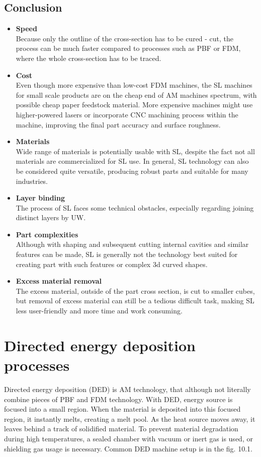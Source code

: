 \documentclass[a4paper, twoside, 11pt]{report}
\newcommand\pro{\item[$+$]}
\newcommand\con{\item[$-$]}
\begin{document}
\section{Conclusion}
\begin{itemize}
\pro \textbf{Speed}\\
Because only the outline of the cross-section has to be cured - cut, the process can be much faster compared to processes such as PBF or FDM, where the whole cross-section has to be traced.

\pro \textbf{Cost}\\
Even though more expensive than low-cost FDM machines, the SL machines for small scale products are on the cheap end of AM machines spectrum, with possible cheap paper feedstock material. More expensive machines might use higher-powered lasers or incorporate CNC machining process within the machine, improving the final part accuracy and surface roughness.

\pro \textbf{Materials}\\
Wide range of materials is potentially usable with SL, despite the fact not all materials are commercialized for SL use. In general, SL technology can also be considered quite versatile, producing robust parts and suitable for many industries.
\\[10pt]

\con \textbf{Layer binding}\\
The process of SL faces some technical obstacles, especially regarding joining distinct layers by UW.

\con \textbf{Part complexities}\\
Although with shaping and subsequent cutting internal cavities and similar features can be made, SL is generally not the technology best suited for creating part with such features or complex 3d curved shapes.

\con \textbf{Excess material removal}\\
The excess material, outside of the part cross section, is cut to smaller cubes, but removal of excess material can still be a tedious difficult task, making SL less user-friendly and more time and work consuming.
\end{itemize}

\chapter{Directed energy deposition processes}

Directed energy deposition (DED) is AM technology, that although not literally combine pieces of PBF and FDM technology. With DED, energy source is focused into a small region. When the material is deposited into this focused region, it instantly melts, creating a melt pool. As the heat source moves away, it leaves behind a track of solidified material. To prevent material degradation during high temperatures, a sealed chamber with vacuum or inert gas is used, or shielding gas usage is necessary. Common DED machine setup is in the fig. 10.1.
\end{document}
